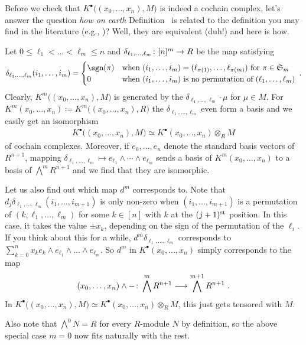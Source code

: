 \documentclass[a4paper,parskip=half,numbers=enddot, DIV=12]{scrreprt}
\begin{document}
\begin{rem}
	 Before we check that $K^\bullet\big((x_0,\ldots,x_n),M\big)$ is indeed a cochain complex, let's answer the question \emph{how on earth} Definition~ is related to the definition you may find in the literature (e.g., \cite[p.~423]{eisenbudCommAlg})? Well, they are equivalent (duh!) and here is how.
	 
	 Let $0\leq\ell_1<\ldots< \ell_m\leq n$ and $\delta_{\ell_1,\ldots,\ell_m}\colon [n]^m\morphism R$ be the map satisfying 
	 \begin{align*}
	 	\delta_{\ell_1,\ldots,\ell_m}(i_1,\ldots,i_m)=\begin{cases}
		 	\sgn(\pi) & \text{when }(i_1,\ldots,i_m)=(\ell_{\pi(1)},\ldots,\ell_{\pi(m)})\text{ for }\pi\in\SS_{m}\\
		 	0 & \text{when }(i_1,\ldots,i_m)\text{ is no permutation of }(\ell_1,\ldots,\ell_m)
	 	\end{cases}\;.
	 \end{align*}
	  Clearly, $K^m\big((x_0,\ldots,x_n),M\big)$ is generated by the $\delta_{\ell_1,\ldots,\ell_m}\cdot \mu$ for $\mu\in M$. For $K^m(x_0,\ldots,x_n)\coloneqq K^m\big((x_0,\ldots,x_n),R\big)$ the $\delta_{\ell_1,\ldots,\ell_m}$ even form a basis and we easily get an isomorphism
	  \begin{align*}
	  	K^\bullet\big((x_0,\ldots,x_n),M\big)\simeq K^\bullet(x_0,\ldots,x_n)\otimes_R M
	  \end{align*}
	  of cochain complexes. Moreover, if $e_0,\ldots,e_n$ denote the standard basis vectors of $R^{n+1}$, mapping $\delta_{\ell_1,\ldots,\ell_m}\mapsto e_{\ell_1}\wedge \cdots\wedge e_{\ell_m}$ sends a basis of $K^m(x_0,\ldots,x_n)$ to a basis of $\bigwedge^mR^{n+1}$ and we find that they are isomorphic.
	  
	  Let us also find out which map $d^m$ corresponds to. Note that $d_j\delta_{\ell_1,\ldots,\ell_m}(i_1,\ldots,i_{m+1})$ is only non-zero when $(i_1,\ldots,i_{m+1})$ is a permutation of $(k,\ell_1,\ldots,\ell_m)$ for some $k\in[n]$ with $k$ at the $(j+1)^{\text{st}}$ position. In this case, it takes the value $\pm x_k$, depending on the sign of the permutation of the $\ell_i$. If you think about this for a while, $d^m\delta_{\ell_1,\ldots,\ell_m}$ corresponds to $\sum_{k=0}^nx_ke_k\wedge e_{\ell_1}\wedge \ldots \wedge e_{\ell_m}$. So $d^m$ in $K^\bullet(x_0,\ldots,x_n)$ simply corresponds to the map
	  \begin{align*}
	  	(x_0,\ldots,x_n)\wedge -\colon \bigwedge^mR^{n+1}\morphism \bigwedge^{m+1}R^{n+1}\;.
	  \end{align*}
	  In $K^\bullet\big((x_0,\ldots,x_n),M\big)\simeq K^\bullet(x_0,\ldots,x_n)\otimes_R M$, this just gets tensored with $M$.
	  
	  Also note that $\bigwedge^0N=R$ for every $R$-module $N$ by definition, so the above special case $m=0$ now fits naturally with the rest.
\end{rem}
\end{document}
